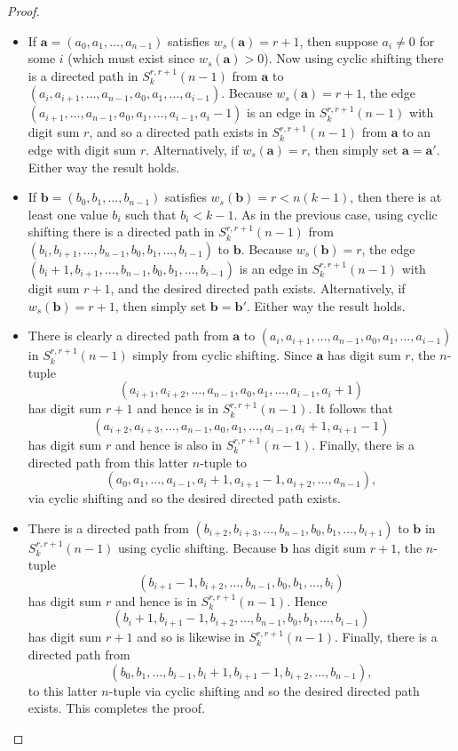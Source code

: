 \documentclass[a4paper,11pt]{article}
\theoremstyle{plain}
\theoremstyle{definition}
\theoremstyle{remark}
\begin{document}
\begin{proof}
\begin{itemize}
\item[(i)] If $\mathbf{a}=(a_0,a_1,\dots,a_{n-1})$ satisfies $w_s(\mathbf{a})=r+1$, then
    suppose $a_i\neq0$ for some $i$ (which must exist since $w_s(\mathbf{a})>0$).  Now using
    cyclic shifting there is a directed path in $S_k^{r,r+1}(n-1)$ from $\mathbf{a}$ to
    $(a_i,a_{i+1},\dots,a_{n-1},a_0,a_1,\dots,a_{i-1})$. Because $w_s(\mathbf{a})=r+1$, the
    edge $(a_{i+1},\dots,a_{n-1},a_0,a_1,\dots,a_{i-1},a_{i}-1)$ is an edge in
    $S_k^{r,r+1}(n-1)$ with digit sum $r$, and so a directed path exists in $S_k^{r,r+1}(n-1)$
    from $\mathbf{a}$ to an edge with digit sum $r$. Alternatively, if $w_s(\mathbf{a})=r$,
    then simply set $\mathbf{a}=\mathbf{a}'$. Either way the result holds.
\item[(ii)] If $\mathbf{b}=(b_0,b_1,\dots,b_{n-1})$ satisfies $w_s(\mathbf{b})=r<n(k-1)$, then
    there is at least one value $b_i$ such that $b_i<k-1$.  As in the previous case, using
    cyclic shifting there is a directed path in $S_k^{r,r+1}(n-1)$ from
    $(b_i,b_{i+1},\dots,b_{n-1},b_0,b_1,\dots,b_{i-1})$ to $\mathbf{b}$. Because
    $w_s(\mathbf{b})=r$, the edge $(b_i+1,b_{i+1},\dots,b_{n-1},b_0,b_1,\dots,b_{i-1})$ is an
    edge in $S_k^{r,r+1}(n-1)$ with digit sum $r+1$, and the desired directed path exists.
    Alternatively, if $w_s(\mathbf{b})=r+1$, then simply set $\mathbf{b}=\mathbf{b}'$.  Either
    way the result holds.
\item[(iii)] There is clearly a directed path from $\mathbf{a}$ to
    $(a_i,a_{i+1},\dots,a_{n-1},a_0,a_1,\dots,a_{i-1})$ in $S_k^{r,r+1}(n-1)$ simply from
    cyclic shifting. Since $\mathbf{a}$ has digit sum $r$, the $n$-tuple
    \[(a_{i+1},a_{i+2},\dots,a_{n-1},a_0,a_1,\dots,a_{i-1},a_i+1)\]
    has digit sum $r+1$ and hence is in $S_k^{r,r+1}(n-1)$.  It follows that
    \[(a_{i+2},a_{i+3},\dots,a_{n-1},a_0,a_1,\dots,a_{i-1},a_i+1,a_{i+1}-1)\]
    has digit sum $r$ and hence is also in $S_k^{r,r+1}(n-1)$. Finally, there is a directed
    path from this latter $n$-tuple to
    \[ (a_0,a_1,\dots,a_{i-1},a_i+1, a_{i+1}-1,a_{i+2},\dots,a_{n-1}), \]
    via cyclic shifting and so the desired directed path exists.
\item[(iv)] There is a directed path from
    $(b_{i+2},b_{i+3},\dots,b_{n-1},b_0,b_1,\dots,b_{i+1})$ to $\mathbf{b}$ in
    $S_k^{r,r+1}(n-1)$ using cyclic shifting.  Because  $\mathbf{b}$ has digit sum $r+1$, the
    $n$-tuple
\[(b_{i+1}-1,b_{i+2},\dots,b_{n-1},b_0,b_1,\dots,b_i)\]
has digit sum $r$ and hence is in $S_k^{r,r+1}(n-1)$.  Hence
\[(b_i+1,b_{i+1}-1,b_{i+2},\dots,b_{n-1},b_0,b_1,\dots,b_{i-1})\]
has digit sum $r+1$ and so is likewise in $S_k^{r,r+1}(n-1)$. Finally, there is a directed path
    from
    \[ (b_0,b_1,\dots,b_{i-1},b_i+1, b_{i+1}-1,b_{i+2},\dots,b_{n-1}), \]
    to this latter $n$-tuple via cyclic shifting and so the desired directed path exists.  This
    completes the proof.
\end{itemize}
\end{proof}
\end{document}
